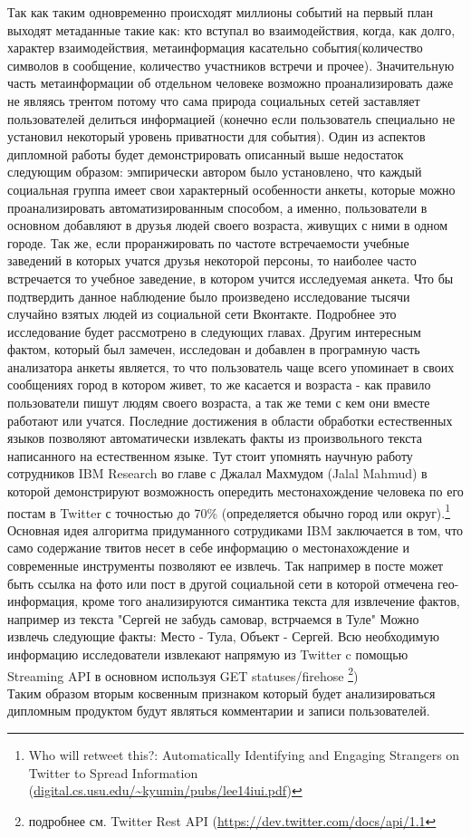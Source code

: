  Так как  таким одновременно происходят миллионы событий на первый план выходят метаданные такие как: кто вступал во взаимодействия, когда, как долго, характер взаимодействия, метаинформация касательно события(количество символов в сообщение, количество участников встречи и прочее). Значительную часть метаинформации об отдельном человеке возможно проанализировать даже не являясь трентом потому что сама природа социальных сетей заставляет пользователей делиться информацией (конечно если пользователь специально не установил некоторый уровень приватности для события). Один из аспектов дипломной работы будет демонстрировать описанный выше недостаток следующим образом: эмпирически автором было установлено, что каждый социальная группа имеет свои характерный особенности анкеты, которые можно проанализировать автоматизированным способом, а именно, пользователи в основном добавляют в друзья людей своего возраста, живущих с ними в одном городе. Так же, если проранжировать по частоте встречаемости учебные заведений в которых учатся друзья некоторой персоны, то наиболее часто встречается то учебное заведение, в котором учится исследуемая анкета. Что бы подтвердить данное наблюдение было произведено исследование тысячи случайно взятых людей из социальной сети Вконтакте. Подробнее это исследование будет рассмотрено в следующих главах. Другим интересным фактом, который был замечен, исследован и добавлен в програмную часть анализатора анкеты является, то что пользователь чаще всего упоминает в своих сообщениях город в котором живет, то же касается и возраста - как правило пользователи пишут людям своего возраста, а так же теми с кем они вместе работают или учатся. Последние достижения в области обработки естественных языков позволяют автоматически извлекать факты из произвольного текста написанного на естественном языке. Тут стоит упомнять научную работу сотрудников IBM Research во главе с Джалал Махмудом (Jalal Mahmud) в которой демонстрируют возможность опередить местонахождение человека по его постам в Twitter с точностью до 70\% (определяется обычно город или округ).\footnote{Who will retweet this?: Automatically Identifying and Engaging Strangers on Twitter to Spread Information (\url{digital.cs.usu.edu/~kyumin/pubs/lee14iui.pdf‎})}
 Основная идея алгоритма придуманного сотрудиками IBM заключается в том, что само содержание твитов несет в себе информацию о местонахождение и современные  инструменты  позволяют ее извлечь. Так например в посте может быть ссылка на фото или пост в другой социальной сети в которой отмечена гео-информация, кроме того анализируются симантика текста для извлечение фактов, например из текста "Сергей не забудь самовар, встрчаемся в Туле" Можно извлечь следующие факты: Место - Тула, Объект - Сергей. Всю необходимую информацию исследователи извлекают напрямую из Twitter c помощью Streaming API в основном используя GET statuses/firehose \footnote{подробнее см. Twitter Rest API (\url{https://dev.twitter.com/docs/api/1.1}})\\ Таким образом вторым косвенным признаком который будет анализироваться дипломным продуктом будут являться комментарии и записи пользователей.



